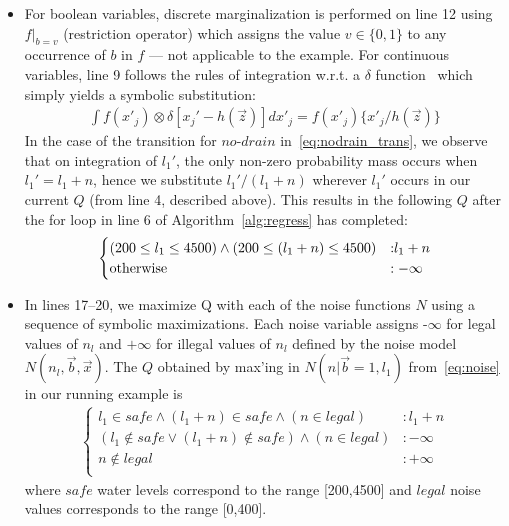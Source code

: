\documentclass[letterpaper]{article}
\begin{document}
\begin{itemize}
\item For boolean variables, discrete marginalization is performed on
  line 12 using $f|_{b=v}$ (restriction operator) which assigns the
  value $v \in \{ 0,1 \}$ to any occurrence of $b$ in $f$ --- not
  applicable to the example. For continuous variables, line 9 follows
  the rules of integration w.r.t. a $\delta$
  function~\cite{sanner_uai11} which simply yields a symbolic
  substitution: {\footnotesize
\begin{align}
\int f(x'_j) \otimes \delta[x_j' - h(\vec{z})] dx'_j = f(x'_j) \{ x'_j / h(\vec{z}) \}\nonumber
\end{align}}
In the case of the transition for $\mathit{no}\text{-}\mathit{drain}$
in~\eqref{eq:nodrain_trans}, we observe that on integration of $l_1'$,
the only non-zero probability mass occurs when $l_1' = l_1 + n$, 
hence we substitute $l_1'/(l_1 + n)$ wherever
$l_1'$ occurs in our current $Q$ (from line 4, described above).  
This results in the following $Q$ after the for
loop in line 6 of Algorithm~\ref{alg:regress} has completed:
{\footnotesize
\begin{align*}
\begin{cases}
(200 \leq l_1 \leq 4500) \wedge (200 \leq (l_1 + n) \leq 4500) &: \hspace{-1mm} l_1 + n\\
\text{otherwise} &: -\infty\\
\end{cases}
\end{align*}
}
\item In lines 17--20, we 
maximize Q with each of the noise functions $N$ using a sequence of symbolic maximizations. Each noise variable assigns -$\infty$ for legal values of $n_l$ and $+\infty$ for illegal values of $n_l$ defined by the noise model $N(n_l,\vec{b},\vec{x})$. The $Q$ obtained by max'ing in $N(n|\vec{b}=1,l_1)$ from~\eqref{eq:noise} in our running example is 
{\footnotesize
\begin{align*}
\begin{cases}
l_1 \in \mathit{safe} \land (l_1+n) \in \mathit{safe} \land (n \in \mathit{legal}) &: l_1 + n\\
(l_1  \notin \mathit{safe} \lor  (l_1+n) \notin \mathit{safe}) \land (n \in \mathit{legal}) &:  -\infty\\
n \notin \mathit{legal} &: +\infty\\
\end{cases}
\end{align*}
}
where $\mathit{safe}$ water levels correspond to the range [200,4500] and 
$\mathit{legal}$ noise values corresponds to the range [0,400]. 


\end{itemize}
\end{document}
